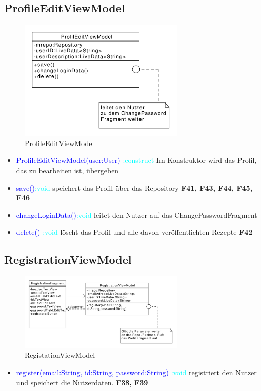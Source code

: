 \subsection{ProfileEditViewModel}
\begin{figure}[H]
	\centering
	\includegraphics[width=0.7\textwidth]{pics/viewModel/Profil_Edit_ViewModel.pdf}%
	\caption{ProfileEditViewModel}%
	\label{viewModel}%
\end{figure}
\begin{itemize}
	
	\item \textcolor{blue}{ProfileEditViewModel(user:User)}
	\textcolor{cyan}{:construct} Im Konstruktor wird das Profil, das zu bearbeiten ist, übergeben
	\item \textcolor{blue}{save()}\textcolor{cyan}{:void} speichert das Profil über das Repository \textbf{F41, F43, F44, F45, F46}
	\item \textcolor{blue}{changeLoginData()}\textcolor{cyan}{:void} leitet den Nutzer auf das ChangePasswordFragment
	
	\item \textcolor{blue}{delete()}
	\textcolor{cyan}{:void} löscht das Profil und alle davon veröffentlichten Rezepte \textbf{F42}
\end{itemize}

\subsection{RegistrationViewModel}
\begin{figure}[H]
	\centering
	\includegraphics[width=0.7\textwidth]{pics/viewModel/Registration_ViewModel.pdf}%
	\caption{RegistationViewModel}%
	\label{viewModel}%
\end{figure}
\begin{itemize}
	\item \textcolor{blue}{register(email:String, id:String, password:String)}
	\textcolor{cyan}{:void} registriert den Nutzer und speichert die Nutzerdaten. \textbf{F38, F39}
	
\end{itemize}


